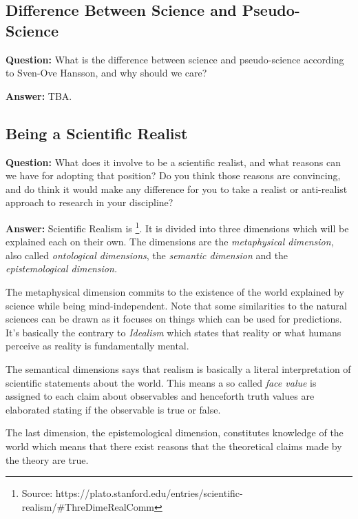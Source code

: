 \documentclass[11pt]{scrartcl}
\begin{document}
\subsection{Difference Between Science and Pseudo-Science}

\textbf{Question:} What is the difference between science and pseudo-science according to Sven-Ove Hansson, and why should we care?

\bigbreak

\textbf{Answer:} TBA.

\subsection{Being a Scientific Realist}

\textbf{Question:} What does it involve to be a scientific realist, and what reasons can we have for adopting that position? Do you think those reasons are convincing, and do think it would make any difference for you to take a realist or anti-realist approach to research in your discipline?

\bigbreak

\textbf{Answer:} Scientific Realism is  \footnote{Source: https://plato.stanford.edu/entries/scientific-realism/\#ThreDimeRealComm}. It is divided into three dimensions which will be explained each on their own. The dimensions are the \textit{metaphysical dimension}, also called \textit{ontological dimensions}, the \textit{semantic dimension} and the \textit{epistemological dimension.}

The metaphysical dimension commits to the existence of the world explained by science while being mind-independent. Note that some similarities to the natural sciences can be drawn as it focuses on things which can be used for predictions. It's basically the contrary to \textit{Idealism} which states that reality or what humans perceive as reality is fundamentally mental.

The semantical dimensions says that realism is basically a literal interpretation of scientific statements about the world. This means a so called \textit{face value} is assigned to each claim about observables and henceforth truth values are elaborated stating if the observable is true or false.

The last dimension, the epistemological dimension, constitutes knowledge of the world which means that there exist reasons that the theoretical claims made by the theory are true.
\end{document}
